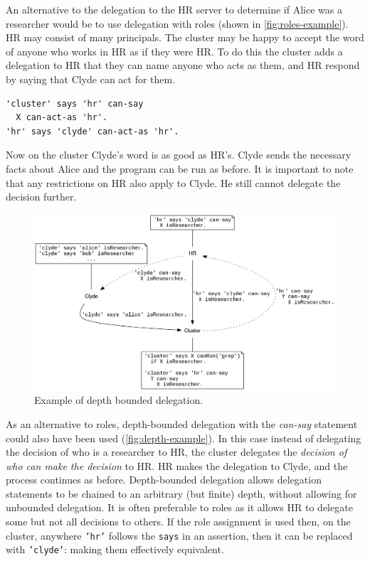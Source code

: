 \documentclass[thesis.tex]{subfiles}
\begin{document}
An alternative to the delegation to the HR server to determine if
Alice was a researcher would be to use delegation with roles (shown in
\autoref{fig:roles-example}).  HR may consist of many principals.  The
cluster may be happy to accept the word of anyone who works in HR as
if they were HR.  To do this the cluster adds a delegation to HR that
they can name anyone who acts as them, and HR respond by saying that
Clyde can act for them.
\begin{lstlisting}
'cluster' says 'hr' can-say
  X can-act-as 'hr'.
'hr' says 'clyde' can-act-as 'hr'.
\end{lstlisting}
Now on the cluster Clyde's word is as good as HR's.
Clyde sends the necessary facts about Alice and the program can be run as before.
It is important to note that any restrictions on HR also apply to Clyde.  He still cannot delegate the decision further.

\begin{figure}
  \centering
  \includegraphics[width=\textwidth]{figures/secpal-example-delegation2.png}
  \caption{Example of depth bounded delegation.}
  \label{fig:depth-example}
\end{figure}

As an alternative to roles, depth-bounded delegation with the
\emph{can-say} statement could also have been used
(\autoref{fig:depth-example}).  In this case instead of delegating the
decision of who is a researcher to HR, the cluster delegates the
\emph{decision of who can make the decision} to HR.  HR makes the
delegation to Clyde, and the process continues as before.
Depth-bounded delegation allows delegation statements to be chained to
an arbitrary (but finite) depth, without allowing for unbounded
delegation.  It is often preferable to roles as it allows HR to
delegate some but not all decisions to others.  If the role assignment
is used then, on the cluster, anywhere \texttt{'hr'} follows the
\texttt{says} in an assertion, then it can be replaced with
\texttt{'clyde'}: making them effectively equivalent.
\end{document}
